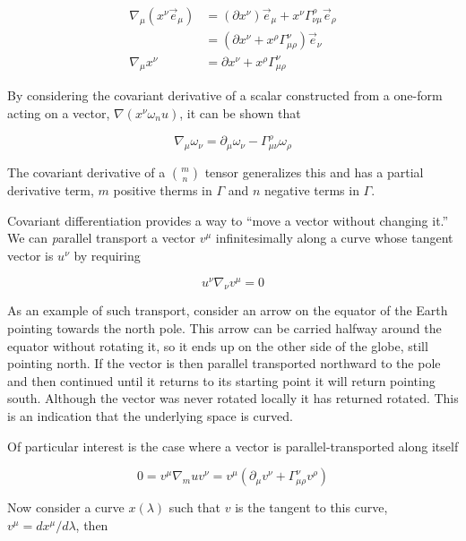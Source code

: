 \begin{align}
\label{eq:covariant_derivative}
\nabla_\mu (x^\nu \vec{e}_\mu) &= 
(\partial x^\nu) \vec{e}_\mu + 
x^\nu \Gamma^\rho_{\nu\mu} \vec{e}_\rho \\
&= (\partial x^\nu + x^\rho \Gamma^\nu_{\mu\rho}) \vec{e}_\nu \\
\nabla_\mu x^\nu &= \partial x^\nu + x^\rho \Gamma^\nu_{\mu\rho}
\end{align}

By considering the covariant derivative of a scalar constructed from a
one-form acting on a vector, $\nabla (x^\nu \omega_nu)$, it can be shown
that

\begin{equation*}
\nabla_\mu \omega_\nu = \partial_\mu \omega_\nu - 
\Gamma^\rho_{\mu\nu} \omega_\rho
\end{equation*}

The covariant derivative of a ${m \choose n}$ tensor generalizes this
and has a partial derivative term, $m$ positive therms in $\Gamma$ and
$n$ negative terms in $\Gamma$.

Covariant differentiation provides a way to ``move a vector without
changing it.''  We can {\emph parallel transport} a vector $v^\mu$
infinitesimally along a curve whose tangent vector is $u^\nu$ by
requiring

\begin{equation*}
u^\nu \nabla_\nu v^\mu = 0
\end{equation*}

As an example of such transport, consider an arrow on the equator of
the Earth pointing towards the north pole.  This arrow can be carried
halfway around the equator without rotating it, so it ends up on the
other side of the globe, still pointing north.  If the vector is then
parallel transported northward to the pole and then continued until it
returns to its starting point it will return pointing south.  Although
the vector was never rotated locally it has returned rotated.  This is
an indication that the underlying space is curved.

Of particular interest is the case where a vector is
parallel-transported along itself

\begin{equation*}
0 = v^\mu \nabla_mu v^\nu 
= v^\mu (\partial_\mu v^\nu + \Gamma^\nu_{\mu\rho} v^\rho)
\end{equation*}

Now consider a curve $x(\lambda)$ such that $v$ is the tangent to this
curve, $v^\mu = d x^\mu/d\lambda$, then

